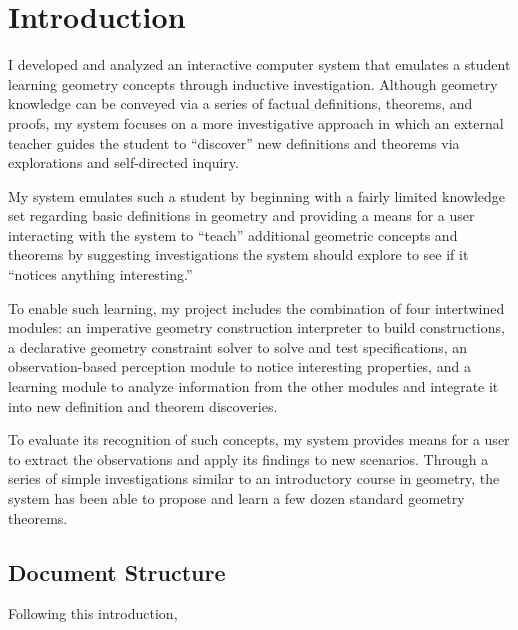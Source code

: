 \chapter{Introduction}
\label{chap:intro}

I developed and analyzed an interactive computer system that emulates
a student learning geometry concepts through inductive
investigation. Although geometry knowledge can be conveyed via a
series of factual definitions, theorems, and proofs, my system focuses
on a more investigative approach in which an external teacher guides
the student to ``discover'' new definitions and theorems via
explorations and self-directed inquiry.

My system emulates such a student by beginning with a fairly limited
knowledge set regarding basic definitions in geometry and providing a
means for a user interacting with the system to ``teach'' additional
geometric concepts and theorems by suggesting investigations the
system should explore to see if it ``notices anything interesting.''

To enable such learning, my project includes the combination of four
intertwined modules: an imperative geometry construction interpreter
to build constructions, a declarative geometry constraint solver to
solve and test specifications, an observation-based perception module
to notice interesting properties, and a learning module to analyze
information from the other modules and integrate it into new
definition and theorem discoveries.

To evaluate its recognition of such concepts, my system provides means
for a user to extract the observations and apply its findings to new
scenarios.  Through a series of simple investigations similar to an
introductory course in geometry, the system has been able to propose
and learn a few dozen standard geometry theorems.

\section{Document Structure}

Following this introduction,

